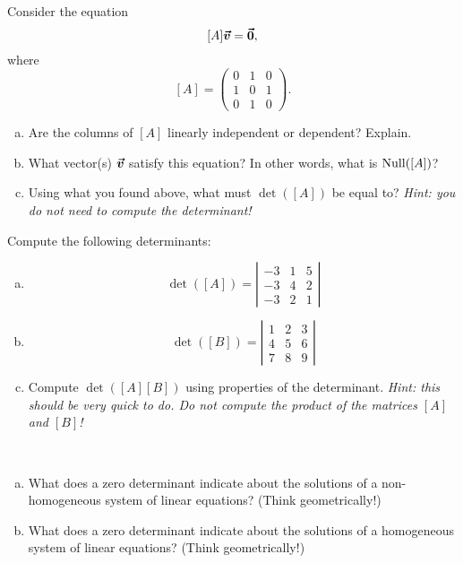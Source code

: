 \documentclass[12pt]{article} %
\begin{document}
\begin{problem}
Consider the equation
\[
[A]\boldsymbol{\vec{v}} = \boldsymbol{\vec{0}},
\]
where
\[
[A] = \begin{pmatrix} 0 & 1 & 0 \\ 1 & 0 & 1 \\ 0 & 1 & 0 \end{pmatrix}.
\]
\begin{enumerate}[(a)]
    \item Are the columns of $[A]$ linearly independent or dependent? Explain.
    \item What vector(s) $\boldsymbol{\vec{v}}$ satisfy this equation? In other words, what is $\mathrm{Null}([A])$?
    \item Using what you found above, what must $\det([A])$ be equal to? \emph{Hint: you do not need to compute the determinant!}
\end{enumerate}
\end{problem}

\begin{problem}
Compute the following determinants:
\begin{enumerate}[(a)]
    \item
    \[
    \det([A])=\left| \begin{array}{ccc}
    -3& 1 & 5\\
    -3& 4 & 2\\
    -3& 2 & 1
    \end{array}\right|
    \]
    \item
    \[
    \det([B])=\left| \begin{array}{ccc}
    1& 2& 3\\
    4& 5& 6\\
    7& 8& 9
    \end{array}\right|
    \]
    \item Compute $\det([A][B])$ using properties of the determinant. \emph{Hint: this should be very quick to do. Do not compute the product of the matrices $[A]$ and $[B]$!}
\end{enumerate}
\end{problem}

\begin{problem}~
\begin{enumerate}[(a)]
    \item What does a zero determinant indicate about the solutions of a non-homogeneous system of linear equations? (Think geometrically!)
    \item What does a zero determinant indicate about the solutions of a homogeneous system of linear equations? (Think geometrically!)
\end{enumerate}
\end{problem}
\end{document}

